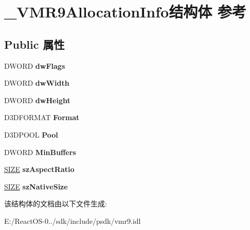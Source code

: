 \hypertarget{struct___v_m_r9_allocation_info}{}\section{\+\_\+\+V\+M\+R9\+Allocation\+Info结构体 参考}
\label{struct___v_m_r9_allocation_info}
\subsection*{Public 属性}
\begin{DoxyCompactItemize}
\item 
\mbox{\label{struct___v_m_r9_allocation_info_a59e53e4b51a579872a84ee464cf4d488}} 
D\+W\+O\+RD {\bfseries dw\+Flags}
\item 
\mbox{\label{struct___v_m_r9_allocation_info_ac398207ebb2127e958bfcd84a7a98996}} 
D\+W\+O\+RD {\bfseries dw\+Width}
\item 
\mbox{\label{struct___v_m_r9_allocation_info_a98ef0bc9be4f097772f2ee92fdb83295}} 
D\+W\+O\+RD {\bfseries dw\+Height}
\item 
\mbox{\label{struct___v_m_r9_allocation_info_a821358f320f5de63e1b3fd3631b15877}} 
D3\+D\+F\+O\+R\+M\+AT {\bfseries Format}
\item 
\mbox{\label{struct___v_m_r9_allocation_info_ae1439e719875d65edf7a003f4b4cf131}} 
D3\+D\+P\+O\+OL {\bfseries Pool}
\item 
\mbox{\label{struct___v_m_r9_allocation_info_a261adba2e29fcd12190a8c859af84069}} 
D\+W\+O\+RD {\bfseries Min\+Buffers}
\item 
\mbox{\label{struct___v_m_r9_allocation_info_ab31d7af97caf1c737b7fce75463fe16c}} 
\hyperlink{structtag_s_i_z_e}{S\+I\+ZE} {\bfseries sz\+Aspect\+Ratio}
\item 
\mbox{\label{struct___v_m_r9_allocation_info_a329531cb606227e77552b3a58c175039}} 
\hyperlink{structtag_s_i_z_e}{S\+I\+ZE} {\bfseries sz\+Native\+Size}
\end{DoxyCompactItemize}


该结构体的文档由以下文件生成\+:\begin{DoxyCompactItemize}
\item 
E\+:/\+React\+O\+S-\/0../sdk/include/psdk/vmr9.\+idl\end{DoxyCompactItemize}
